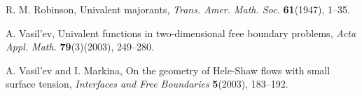 \documentclass[a4paper,12pt]{amsart}
\theoremstyle{definition}
\begin{document}
\begin{thebibliography}{150}
 R. M. Robinson,
\textrm{Univalent majorants},
\textit{Trans. Amer. Math. Soc.} \textbf{61}(1947), 1--35.

 A. Vasil'ev,
Univalent functions in two-dimensional free boundary problems,
\textit{Acta Appl. Math.} \textbf{79}(3)(2003), 249--280.

 A. Vasil'ev and I. Markina,
On the geometry of Hele-Shaw flows with small surface tension,
\textit{Interfaces and Free Boundaries} \textbf{5}(2003), 183--192.

\end{thebibliography}
\end{document}
